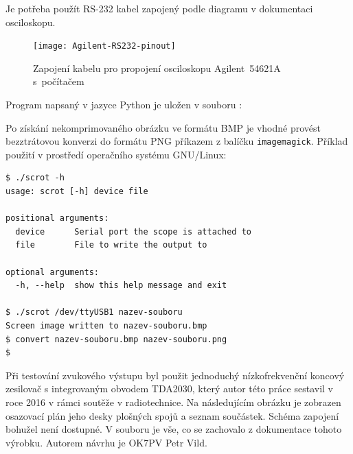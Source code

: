 Je potřeba použít RS-232 kabel zapojený podle diagramu v dokumentaci
osciloskopu.

\begin{figure}[htbp]
    \centering
    \texttt{[image: Agilent-RS232-pinout]}
    \caption{%
        Zapojení kabelu pro propojení osciloskopu Agilent~54621A
        s~počítačem~\cite{Agilent54621Auser}
    }
    \label{fig:agilent RS232 pinout}
\end{figure}

Program napsaný v jazyce Python je uložen v souboru :


Po získání nekomprimovaného obrázku ve formátu BMP je vhodné provést
bezztrátovou konverzi do formátu PNG příkazem  z balíčku
\texttt{imagemagick}.
Příklad použití v prostředí operačního systému GNU/Linux:
\begin{lstlisting}[style=terminal]
$ ./scrot -h
usage: scrot [-h] device file

positional arguments:
  device      Serial port the scope is attached to
  file        File to write the output to

optional arguments:
  -h, --help  show this help message and exit

$ ./scrot /dev/ttyUSB1 nazev-souboru
Screen image written to nazev-souboru.bmp
$ convert nazev-souboru.bmp nazev-souboru.png
$
\end{lstlisting}




\clearpage
{}
\label{app:TDA2030}
Při testování zvukového výstupu byl použit jednoduchý nízkofrekvenční koncový
zesilovač s integrovaným obvodem TDA2030, který autor této práce sestavil
v roce 2016 v rámci soutěže v radiotechnice. Na následujícím obrázku je
zobrazen osazovací plán jeho desky plošných spojů a seznam součástek. Schéma
zapojení bohužel není dostupné.
V souboru  je vše, co se zachovalo
z dokumentace tohoto výrobku. Autorem návrhu je OK7PV Petr Vild.

